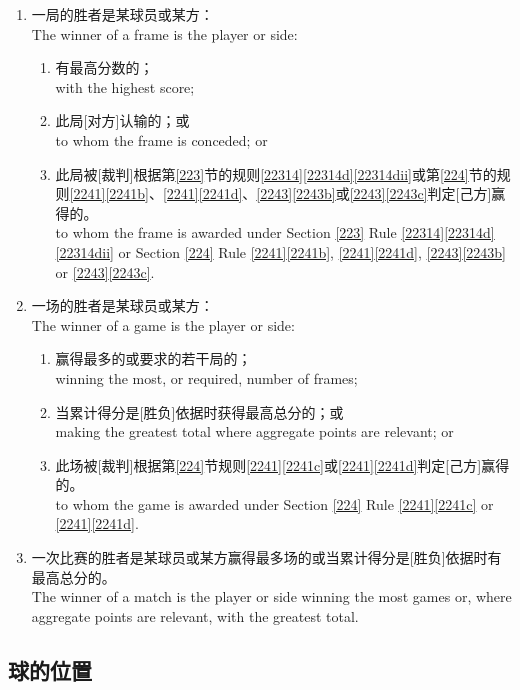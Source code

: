 \begin{enumerate}[label=(\alph*)]
    \item 一局的胜者是某球员或某方：\\
    The winner of a frame is the player or side:
    \begin{enumerate}[label=(\roman*)]
        \item 有最高分数的；\\
        with the highest score;
        \item 此局[对方]认输的；或\\
        to whom the frame is conceded; or
        \item 此局被[裁判]根据第\ref{223}节的规则\ref{22314}\ref{22314d}\ref{22314dii}或第\ref{224}节的规则\ref{2241}\ref{2241b}、\ref{2241}\ref{2241d}、\ref{2243}\ref{2243b}或\ref{2243}\ref{2243c}判定[己方]赢得的。\\
        to whom the frame is awarded under Section \ref{223} Rule \ref{22314}\ref{22314d}\ref{22314dii} or Section \ref{224} Rule \ref{2241}\ref{2241b}, \ref{2241}\ref{2241d}, \ref{2243}\ref{2243b} or \ref{2243}\ref{2243c}.
    \end{enumerate}
    \item 一场的胜者是某球员或某方：\\
    The winner of a game is the player or side:
    \begin{enumerate}[label=(\roman*)]
        \item 赢得最多的或要求的若干局的；\\
        winning the most, or required, number of frames;
        \item 当累计得分是[胜负]依据时获得最高总分的；或\\
        making the greatest total where aggregate points are relevant; or
        \item 此场被[裁判]根据第\ref{224}节规则\ref{2241}\ref{2241c}或\ref{2241}\ref{2241d}判定[己方]赢得的。\\
        to whom the game is awarded under Section \ref{224} Rule \ref{2241}\ref{2241c} or \ref{2241}\ref{2241d}.
    \end{enumerate}
    \item \label{2231h}一次比赛的胜者是某球员或某方赢得最多场的或当累计得分是[胜负]依据时有最高总分的。\\
    The winner of a match is the player or side winning the most games or, where aggregate points are relevant, with the greatest total.
\end{enumerate}

\subsection{球的位置}\label{2232}

